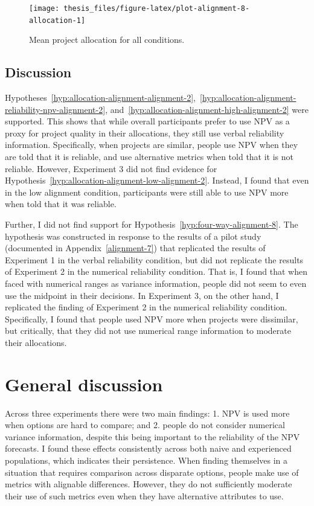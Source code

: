 \documentclass[a4paper, nobind, dvipsnames]{templates/ociamthesis}
\theoremstyle{definition}
\theoremstyle{definition}
\theoremstyle{definition}
\theoremstyle{definition}
\theoremstyle{remark}
\begin{document}
\begin{figure}
\texttt{[image: thesis\_files/figure-latex/plot-alignment-8-allocation-1]} \caption{Mean project allocation for all conditions.}\label{fig:plot-alignment-8-allocation}
\end{figure}

\subsection{Discussion}

Hypotheses~\ref{hyp:allocation-alignment-alignment-2},~\ref{hyp:allocation-alignment-reliability-npv-alignment-2},
and~\ref{hyp:allocation-alignment-high-alignment-2} were supported. This shows
that while overall participants prefer to use NPV as a proxy for project quality
in their allocations, they still use verbal reliability information.
Specifically, when projects are similar, people use NPV when they are told that
it is reliable, and use alternative metrics when told that it is not reliable.
However, Experiment 3 did not find evidence for
Hypothesis~\ref{hyp:allocation-alignment-low-alignment-2}. Instead, I found
that even in the low alignment condition, participants were still able to use
NPV more when told that it was reliable.

Further, I did not find support for Hypothesis~\ref{hyp:four-way-alignment-8}.
The hypothesis was constructed in response to the results of a pilot study
(documented in Appendix~\ref{alignment-7}) that replicated the results of
Experiment 1 in the verbal reliability condition, but did not replicate the
results of Experiment 2 in the numerical reliability condition. That is, I found
that when faced with numerical ranges as variance information, people did not
seem to even use the midpoint in their decisions. In Experiment 3, on the other
hand, I replicated the finding of Experiment 2 in the numerical reliability
condition. Specifically, I found that people used NPV more when projects were
dissimilar, but critically, that they did not use numerical range information to
moderate their allocations.

\section{General discussion}

Across three experiments there were two main findings: 1. NPV is used more when
options are hard to compare; and 2. people do not consider numerical variance
information, despite this being important to the reliability of the NPV
forecasts. I found these effects consistently across both naive and experienced
populations, which indicates their persistence. When finding themselves in a
situation that requires comparison across disparate options, people make use of
metrics with alignable differences. However, they do not sufficiently moderate
their use of such metrics even when they have alternative attributes to use.
\end{document}
